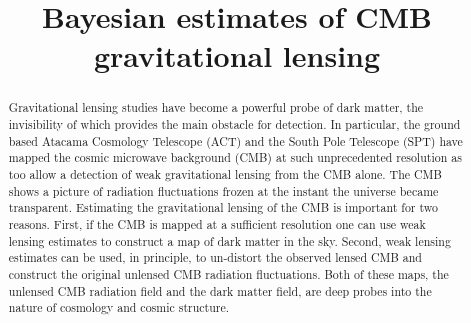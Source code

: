 \documentclass[noinfoline]{imsart}
\begin{document}
\begin{frontmatter}
\title{Bayesian estimates of CMB gravitational lensing}

\begin{abstract} 
Gravitational lensing studies have become a powerful probe of dark matter, the invisibility of which provides the main obstacle for detection. In particular, the ground based Atacama Cosmology Telescope (ACT)  and  the South Pole Telescope (SPT) have mapped the  cosmic microwave background (CMB)  at such unprecedented resolution as too allow a detection of weak gravitational lensing from the CMB alone.
The CMB shows a picture of radiation fluctuations frozen at the instant the universe became transparent. Estimating the gravitational lensing of the CMB  is important for two reasons. First, if the CMB is mapped at a sufficient resolution one can use weak lensing estimates to construct a map of dark matter in the sky.
Second,  weak lensing estimates  can be used, in principle,  to un-distort the observed lensed CMB and construct the original unlensed CMB radiation fluctuations. Both of these maps,  the unlensed CMB radiation field and the dark matter field, are deep probes into the nature of cosmology and cosmic structure. 
\end{abstract}

\begin{keyword}
\end{keyword}

\end{frontmatter}
\end{document}
